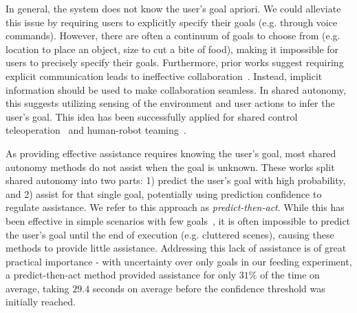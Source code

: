 
In general, the system does not know the user's goal apriori. We could alleviate this issue by requiring users to explicitly specify their goals (e.g. through voice commands). However, there are often a continuum of goals to choose from (e.g. location to place an object, size to cut a bite of food), making it impossible for users to precisely specify their goals. Furthermore, prior works suggest requiring explicit communication leads to ineffective collaboration~\citep{vanhooydonck_2003, goodrich_2003, green_2007}. Instead, implicit information should be used to make collaboration seamless. In shared autonomy, this suggests utilizing sensing of the environment and user actions to infer the user's goal. This idea has been successfully applied for shared control teleoperation~\citep{li_2003,yu_2005,kragic_2005,kofman_2005,aarno_2008,carlson_2012, dragan_2013_assistive, hauser_2013, muelling_2015} and human-robot teaming~\citep{hoffman_2007, nguyen_2011, macindoe_2012, mainprice_2013, koppula_2013, lasota_2015}.  




As providing effective assistance requires knowing the user's goal, most shared autonomy methods do not assist when the goal is unknown. These works split shared autonomy into two parts: 1) predict the user's goal with high probability, and 2) assist for that single goal, potentially using prediction confidence to regulate assistance. We refer to this approach as \emph{predict-then-act}. While this has been effective in simple scenarios with few goals~\citep{yu_2005, kofman_2005, carlson_2012, dragan_2013_assistive, koppula_2013, muelling_2015}, it is often impossible to predict the user's goal until the end of execution (e.g. cluttered scenes), causing these methods to provide little assistance. Addressing this lack of assistance is of great practical importance - with uncertainty over only goals in our feeding experiment, a predict-then-act method provided assistance for only $31\%$ of the time on average, taking $29.4$ seconds on average before the confidence threshold was initially reached.


